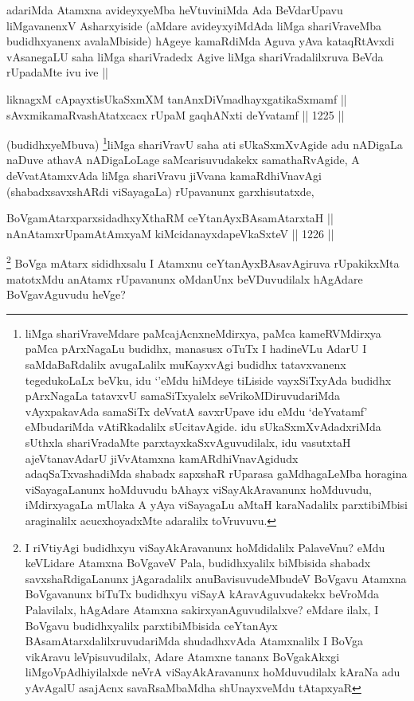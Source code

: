 \begin{artha}
adariMda Atamxna avideyxyeMba heVtuviniMda Ada BeVdarUpavu liMgavanenxV Asharxyiside (aMdare avideyxyiMdAda liMga shariVraveMba budidhxyanenx avalaMbiside) hAgeye kamaRdiMda Aguva yAva kataqRtAvxdi vAsanegaLU saha liMga shariVradedx Agive liMga shariVradalilxruva BeVda rUpadaMte ivu ive ||
\end{artha}


\begin{shl}
liknagxM cApayxtisUkaSxmXM tanAnxDiVmadhayxgatikaSxmamf || \\
sAvxmikamaRvashAtatxcacx rUpaM gaqhANxti deYvatamf ||  1225 || 
\end{shl}

\begin{artha}
(budidhxyeMbuva) \footnote{liMga shariVraveMdare paMcajAcnxneMdirxya, paMca kameRVMdirxya paMca pArxNagaLu budidhx, manasusx oTuTx I hadineVLu AdarU I saMdaBaRdalilx avugaLalilx muKayxvAgi budidhx tatavxvanenx tegedukoLaLx beVku, idu `\stext'eMdu hiMdeye tiLiside vayxSiTxyAda budidhx pArxNagaLa tatavxvU samaSiTxyalelx seVrikoMDiruvudariMda vAyxpakavAda samaSiTx deVvatA savxrUpave idu eMdu `deYvatamf' eMbudariMda vAtiRkadalilx sUcitavAgide. idu sUkaSxmXvAdadxriMda sUthxla shariVradaMte parxtayxkaSxvAguvudilalx, idu vasutxtaH ajeVtanavAdarU jiVvAtamxna kamARdhiVnavAgidudx adaqSaTxvashadiMda shabadx sapxshaR rUparasa gaMdhagaLeMba horagina viSayagaLanunx hoMduvudu bAhayx viSayAkAravanunx hoMduvudu, iMdirxyagaLa mUlaka A yAya viSayagaLu aMtaH karaNadalilx parxtibiMbisi araginalilx acucxhoyadxMte adaralilx toVruvuvu.}liMga shariVravU saha ati sUkaSxmXvAgide adu nADigaLa naDuve athavA nADigaLoLage saMcarisuvudakekx samathaRvAgide, A deVvatAtamxvAda liMga shariVravu jiVvana kamaRdhiVnavAgi (shabadxsavxshARdi viSayagaLa) rUpavanunx garxhisutatxde, 
\end{artha}

\begin{shl}
BoVgamAtarxparxsidadhxyXthaRM ceYtanAyxBAsamAtarxtaH ||  \\
nAnAtamxrUpamAtAmx\s yaM kiMcidanayxdapeVkaSxteV ||  1226 ||  
\end{shl}

\begin{artha}
\footnote{I riVtiyAgi budidhxyu viSayAkAravanunx hoMdidalilx PalaveVnu? eMdu keVLidare Atamxna BoVgaveV Pala, budidhxyalilx biMbisida shabadx savxshaRdigaLanunx jAgaradalilx anuBavisuvudeMbudeV BoVgavu Atamxna BoVgavanunx biTuTx budidhxyu viSayA kAravAguvudakekx beVroMda Palavilalx, hAgAdare Atamxna sakirxyanAguvudilalxve? eMdare ilalx, I BoVgavu budidhxyalilx parxtibiMbisida ceYtanAyx BAsamAtarxdalilxruvudariMda shudadhxvAda Atamxnalilx I BoVga vikAravu leVpisuvudilalx, Adare Atamxne tananx BoVgakAkxgi liMgoVpAdhiyilalxde neVrA viSayAkAravanunx hoMduvudilalx kAraNa adu yAvAgalU asajAcnx savaRsaMbaMdha shUnayxveMdu tAtapxyaR}
BoVga mAtarx sididhxsalu I Atamxnu ceYtanAyxBAsavAgiruva rUpakikxMta matotxMdu anAtamx rUpavanunx oMdanUnx beVDuvudilalx hAgAdare BoVgavAguvudu heVge?
\end{artha}


